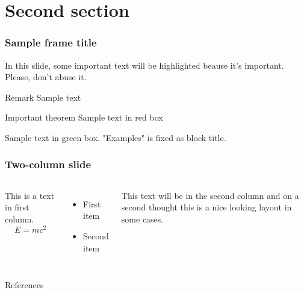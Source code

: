 \documentclass[]{beamer}
\begin{document}

\section{Second section}

\begin{frame}
\frametitle{Sample frame title}

In this slide, some important text will be
\alert{highlighted} beause it's important.
Please, don't abuse it.

\begin{block}{Remark}
Sample text
\end{block}

\begin{alertblock}{Important theorem}
Sample text in red box
\end{alertblock}

\begin{examples}
Sample text in green box. "Examples" is fixed as block title.
\end{examples}
\end{frame}


\begin{frame}
\frametitle{Two-column slide}

\begin{columns}

This is a text in first column.
$$E=mc^2$$
\begin{itemize}
\item First item
\item Second item
\end{itemize}

This text will be in the second column
and on a second thought this is a nice looking
layout in some cases.
\end{columns}
\end{frame}

\begin{frame}{References}
\nocite{*}


\end{frame}
\end{document}
